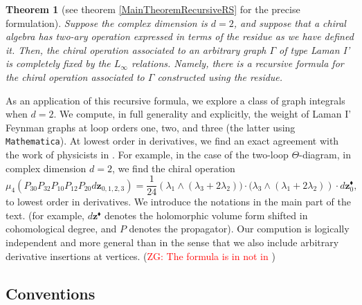 \documentclass[11pt]{amsart}
\newtheorem*{thm*}{Theorem}
\theoremstyle{definition}
\theoremstyle{remark}
\numberwithin{equation}{section}
\newcommand{\Gui}[1]{(\textcolor{red}{ZG: #1})}
\begin{document}
\begin{thm*}[see theorem \ref{MainTheoremRecursiveRS} for the precise formulation]
  Suppose the complex dimension is $d=2$, and suppose that a chiral algebra has two-ary operation expressed in terms
  of the residue
  as we have defined it.
Then, the chiral operation associated to an arbitrary graph $\Gamma$ of type Laman I' is completely fixed by the $L_\infty$
relations.
Namely, there is a recursive formula for the chiral operation associated to $\Gamma$ constructed using the residue.
\end{thm*}

As an application of this recursive formula, we explore a class of graph integrals when $d=2$.
We compute, in full generality and explicitly, the weight of Laman I' Feynman graphs at loop orders one, two, and three (the latter using
\texttt{Mathematica}).
At lowest order in derivatives, we find an exact agreement with the work of physicists in \cite{Gaiotto:2024gii}.
For example, in the case of the two-loop $\Theta$-diagram, in complex dimension $d=2$, we find the chiral operation
\begin{equation}\label{}
  \mu_4 (P_{30} P_{32} P_{10} P_{12}P_{20} d \mathbf{z}_{0,1,2,3}) = \frac{1}{24} \left(\lambda_1 \wedge (\lambda_3 + 2 \lambda_2)) \cdot
    (\lambda_3 \wedge (\lambda_1 + 2 \lambda_2) \right)\cdot d \mathbf{z}_0^{\blacklozenge} ,
\end{equation}
to lowest order in derivatives.
We introduce the notations in the main part of the text.
(for example,  $d \mathbf{z}^{\blacklozenge}$ denotes the holomorphic volume form shifted in cohomological degree, and
$P$ denotes the propagator).
Our compution is logically independent and more general than \cite{Gaiotto:2024gii} in the sense that we also include arbitrary derivative insertions
at vertices. \Gui{The formula is in \cite{budzik2023feynman} not in \cite{Gaiotto:2024gii} }

\subsection*{Conventions}
\end{document}
